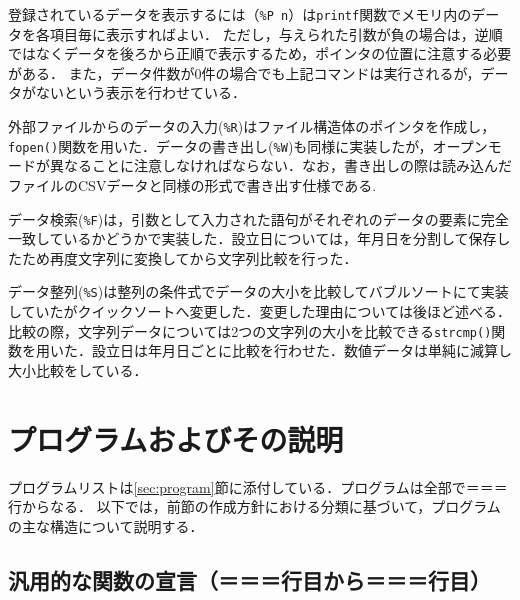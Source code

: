 \documentclass[a4j,11pt]{jarticle}
\begin{document}
登録されているデータを表示するには（\verb|%P n|）は\verb|printf|関数でメモリ内のデータを各項目毎に表示すればよい．
ただし，与えられた引数が負の場合は，逆順ではなくデータを後ろから正順で表示するため，ポインタの位置に注意する必要がある．
また，データ件数が0件の場合でも上記コマンドは実行されるが，データがないという表示を行わせている．

外部ファイルからのデータの入力(\verb|%R|)はファイル構造体のポインタを作成し，\verb|fopen()|関数を用いた．データの書き出し(\verb|%W|)も同様に実装したが，オープンモードが異なることに注意しなければならない．なお，書き出しの際は読み込んだファイルのCSVデータと同様の形式で書き出す仕様である.

データ検索(\verb|%F|)は，引数として入力された語句がそれぞれのデータの要素に完全一致しているかどうかで実装した．設立日については，年月日を分割して保存したため再度文字列に変換してから文字列比較を行った．

データ整列(\verb|%S|)は整列の条件式でデータの大小を比較してバブルソートにて実装していたがクイックソートへ変更した．変更した理由については後ほど述べる．
比較の際，文字列データについては2つの文字列の大小を比較できる\verb|strcmp()|関数を用いた．設立日は年月日ごとに比較を行わせた．数値データは単純に減算し大小比較をしている．


\section{プログラムおよびその説明}\label{sec:explain}



プログラムリストは\ref{sec:program}節に添付している．プログラムは全部で＝＝＝行からなる．
以下では，前節の作成方針における分類に基づいて，プログラムの主な構造について説明する．

\subsection{汎用的な関数の宣言（＝＝＝行目から＝＝＝行目）}
\end{document}
